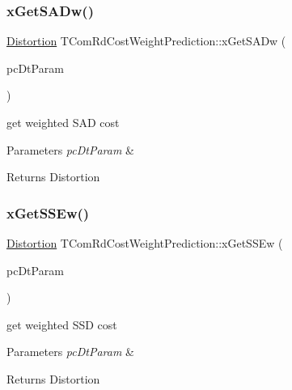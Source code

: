 \subsubsection{\texorpdfstring{x\+Get\+S\+A\+Dw()}{xGetSADw()}}
{\footnotesize\ttfamily \hyperlink{_type_def_8h_aed82b23ef6849d0bc3d95c92102d5b50}{Distortion} T\+Com\+Rd\+Cost\+Weight\+Prediction\+::x\+Get\+S\+A\+Dw (\begin{DoxyParamCaption}\item[{\hyperlink{class_dist_param}{Dist\+Param} $\ast$}]{pc\+Dt\+Param }\end{DoxyParamCaption})}

get weighted S\+AD cost 
\begin{DoxyParams}{Parameters}
{\em pc\+Dt\+Param} & \\
\hline
\end{DoxyParams}
\begin{DoxyReturn}{Returns}
Distortion 
\end{DoxyReturn}
\mbox{\label{namespace_t_com_rd_cost_weight_prediction_aacf668d0358c2086fa8139f8fd4ce7ac}} 
\subsubsection{\texorpdfstring{x\+Get\+S\+S\+Ew()}{xGetSSEw()}}
{\footnotesize\ttfamily \hyperlink{_type_def_8h_aed82b23ef6849d0bc3d95c92102d5b50}{Distortion} T\+Com\+Rd\+Cost\+Weight\+Prediction\+::x\+Get\+S\+S\+Ew (\begin{DoxyParamCaption}\item[{\hyperlink{class_dist_param}{Dist\+Param} $\ast$}]{pc\+Dt\+Param }\end{DoxyParamCaption})}

get weighted S\+SD cost 
\begin{DoxyParams}{Parameters}
{\em pc\+Dt\+Param} & \\
\hline
\end{DoxyParams}
\begin{DoxyReturn}{Returns}
Distortion 
\end{DoxyReturn}
